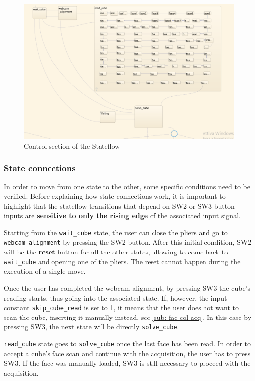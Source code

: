 \documentclass{report}
\begin{document}
\begin{figure}[h]
    \centering
    \includegraphics[width=1.0\linewidth]{images/Cube_actuator/stateflow_control.png}
    \caption{Control section of the Stateflow}
    \label{fig:sta-flo-con}
\end{figure}

\subsubsection{State connections} 
In order to move from one state to the other, some specific conditions need to be verified. Before explaining how state connections work, it is important to highlight that the stateflow transitions that depend on SW2 or SW3 button inputs are \textbf{sensitive to only the rising edge} of the associated input signal.

\bigskip

Starting from the \texttt{wait\_cube} state, the user can close the pliers and go to \texttt{webcam\_alignment} by pressing the SW2 button. After this initial condition, SW2 will be the \textbf{reset} button for all the other states, allowing to come back to \texttt{wait\_cube} and opening one of the pliers. The reset cannot happen during the execution of a single move.

Once the user has completed the webcam alignment, by pressing SW3 the cube's reading starts, thus going into the associated state. If, however, the input constant \texttt{skip\_cube\_read} is set to 1, it means that the user does not want to scan the cube, inserting it manually instead, see \ref{sub: fac-col-acq}. In this case by pressing SW3, the next state will be directly \texttt{solve\_cube}.

\texttt{read\_cube} state goes to \texttt{solve\_cube} once the last face has been read. In order to accept a cube's face scan and continue with the acquisition, the user has to press SW3. If the face was manually loaded, SW3 is still necessary to proceed with the acquisition.
\end{document}
